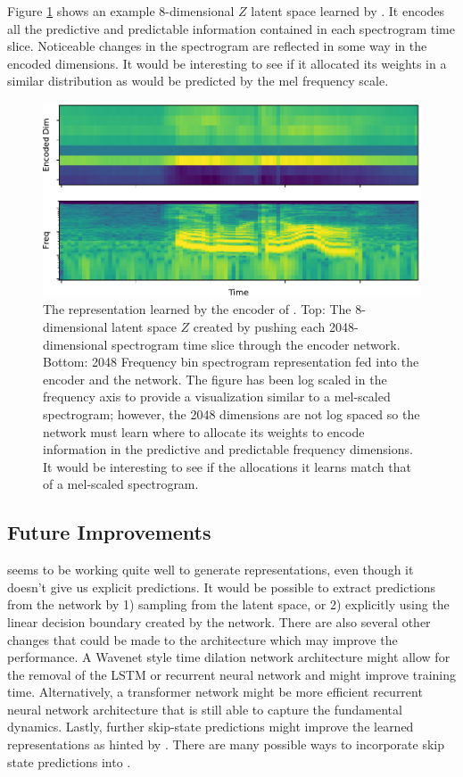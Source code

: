 Figure \ref{fig:encoder} shows an example 8-dimensional $Z$ latent space learned by \CPC. It encodes all the predictive and predictable information contained in each spectrogram time slice. Noticeable changes in the spectrogram are reflected in some way in the encoded dimensions. It would be interesting to see if it allocated its weights in a similar distribution as would be predicted by the mel frequency scale.

\begin{figure}[tbp] 
  \centering
  \includegraphics[width=\textwidth]{figures/encoder.pdf}
  \caption[8 dimensional $Z$ space learned by Contrastive Predictive Coding.]
{The representation learned by the encoder of \CPC. Top: The 8-dimensional latent space $Z$ created by pushing each 2048-dimensional spectrogram time slice through the encoder network. Bottom: 2048 Frequency bin spectrogram representation fed into the encoder and the \CPC network. The figure has been log scaled in the frequency axis to provide a visualization similar to a mel-scaled spectrogram; however, the 2048 dimensions are not log spaced so the \CPC network must learn where to allocate its weights to encode information in the predictive and predictable frequency dimensions. It would be interesting to see if the allocations it learns match that of a mel-scaled spectrogram.
}
  \label{fig:encoder}
\end{figure}

\subsection{Future Improvements}
\CPC seems to be working quite well to generate representations, even though it doesn't give us explicit predictions. It would be possible to extract predictions from the \CPC network by 1) sampling from the latent space, or 2) explicitly using the linear decision boundary created by the network. There are also several other changes that could be made to the architecture which may improve the performance. A Wavenet \cite{van2016wavenet} style time dilation network architecture might allow for the removal of the LSTM or recurrent neural network and might improve training time. Alternatively, a transformer network \cite{vaswani2017attention} might be more efficient recurrent neural network architecture that is still able to capture the fundamental dynamics. Lastly, further skip-state predictions might improve the learned representations as hinted by \cite{gregor2018temporal}. There are many possible ways to incorporate skip state predictions into \CPC.

